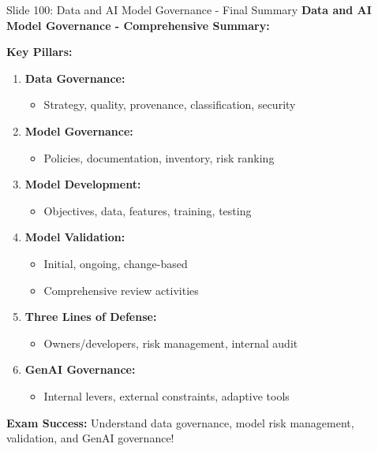 \documentclass[8pt]{beamer}
\begin{document}
	\begin{frame}{Slide 100: Data and AI Model Governance - Final Summary}
		\fontsize{6.5}{7.5}\selectfont
		\textbf{Data and AI Model Governance - Comprehensive Summary:}
		
		\vspace{0.1cm}
		\textbf{Key Pillars:}
		\begin{enumerate}
			\item \textbf{Data Governance:}
			\begin{itemize}
				\item Strategy, quality, provenance, classification, security
			\end{itemize}
			\item \textbf{Model Governance:}
			\begin{itemize}
				\item Policies, documentation, inventory, risk ranking
			\end{itemize}
			\item \textbf{Model Development:}
			\begin{itemize}
				\item Objectives, data, features, training, testing
			\end{itemize}
			\item \textbf{Model Validation:}
			\begin{itemize}
				\item Initial, ongoing, change-based
				\item Comprehensive review activities
			\end{itemize}
			\item \textbf{Three Lines of Defense:}
			\begin{itemize}
				\item Owners/developers, risk management, internal audit
			\end{itemize}
			\item \textbf{GenAI Governance:}
			\begin{itemize}
				\item Internal levers, external constraints, adaptive tools
			\end{itemize}
		\end{enumerate}
		
		\textcolor{myred}{\textbf{Exam Success:}} Understand \textcolor{myblue}{data governance, model risk management, validation, and GenAI governance}!
	\end{frame}
	
\end{document}
